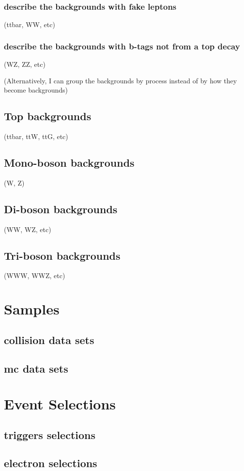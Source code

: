 \documentclass[12pt,chapterheads,oneside]{ucsd}
\begin{document}
        		\subsection{describe the backgrounds with fake leptons} 
			(ttbar, WW, etc)
        		\subsection{describe the backgrounds with b-tags not from a top decay} 
			(WZ, ZZ, etc)

(Alternatively, I can group the backgrounds by process instead of by how they become backgrounds)
	\section{Top backgrounds} (ttbar, ttW, ttG, etc)
	\section{Mono-boson backgrounds} (W, Z)
	\section{Di-boson backgrounds} (WW, WZ, etc)
	\section{Tri-boson backgrounds} (WWW, WWZ, etc)

\chapter{Samples}
	\section{collision data sets}
	\section{mc data sets}
   
\chapter{Event Selections}
	\section{triggers selections}
	\section{electron selections}
\end{document}
